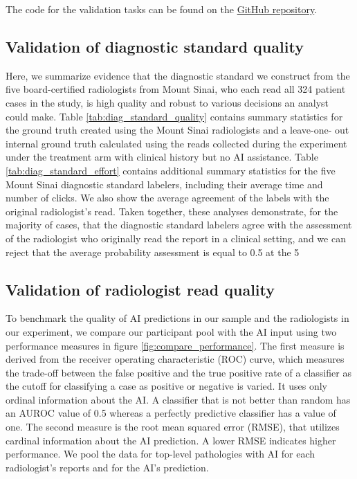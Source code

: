 \documentclass[fleqn,10pt]{wlscirep}
\begin{document}
The code for the validation tasks can be found on the \href{https://github.com/mit-econ-ai/radiology_ai_data.}{GitHub repository}. 

\subsection*{Validation of diagnostic standard quality}

Here, we summarize evidence that the diagnostic standard we construct from the five board-certified radiologists from Mount Sinai, who each read all 324 patient cases in the study, is high quality and robust to various decisions an analyst could make. Table \ref{tab:diag_standard_quality} contains summary statistics for the ground truth created using the Mount Sinai radiologists and a leave-one- out internal ground truth calculated using the reads collected during the experiment under the treatment arm with clinical history but no AI assistance. Table \ref{tab:diag_standard_effort} contains additional summary statistics for the five Mount Sinai diagnostic standard labelers, including their average time and number of clicks. We also show the average agreement of the labels with the original radiologist’s read. Taken together, these analyses demonstrate, for the majority of cases, that the diagnostic standard labelers agree with the assessment of the radiologist who originally read the report in a clinical setting, and we can reject that the average probability assessment is equal to 0.5 at the 5%

\subsection*{Validation of radiologist read quality}

To benchmark the quality of AI predictions in our sample and the radiologists in our experiment, we compare our participant pool with the AI input using two performance measures in figure \ref{fig:compare_performance}. The first measure is derived from the receiver operating characteristic (ROC) curve, which measures the trade-off between the false positive and the true positive rate of a classifier as the cutoff for classifying a case as positive or negative is varied. It uses only ordinal information about the AI. A classifier that is not better than random has an AUROC value of 0.5 whereas a perfectly predictive classifier has a value of one. The second measure is the root mean squared error (RMSE), that utilizes cardinal information about the AI prediction. A lower RMSE indicates higher performance. We pool the data for top-level pathologies with AI for each radiologist’s reports and for the AI’s prediction.
\end{document}
